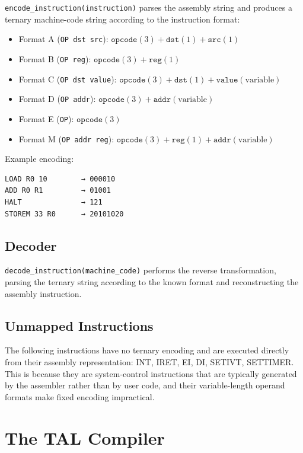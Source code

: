 \documentclass[10pt,a4paper,twoside]{book}
\begin{document}
\texttt{encode\_instruction(instruction)} parses the assembly string and produces a
ternary machine-code string according to the instruction format:

\begin{itemize}
    \item Format A (\texttt{OP dst src}): $\texttt{opcode}(3) + \texttt{dst}(1) +
          \texttt{src}(1)$
    \item Format B (\texttt{OP reg}): $\texttt{opcode}(3) + \texttt{reg}(1)$
    \item Format C (\texttt{OP dst value}): $\texttt{opcode}(3) + \texttt{dst}(1) +
          \texttt{value}(\text{variable})$
    \item Format D (\texttt{OP addr}): $\texttt{opcode}(3) + \texttt{addr}(\text{variable})$
    \item Format E (\texttt{OP}): $\texttt{opcode}(3)$
    \item Format M (\texttt{OP addr reg}): $\texttt{opcode}(3) + \texttt{reg}(1) +
          \texttt{addr}(\text{variable})$
\end{itemize}

Example encoding:
\begin{lstlisting}
LOAD R0 10        → 000010
ADD R0 R1         → 01001
HALT              → 121
STOREM 33 R0      → 20101020
\end{lstlisting}

\section{Decoder}

\texttt{decode\_instruction(machine\_code)} performs the reverse transformation,
parsing the ternary string according to the known format and reconstructing the
assembly instruction.

\section{Unmapped Instructions}

The following instructions have no ternary encoding and are executed directly from
their assembly representation: INT, IRET, EI, DI, SETIVT, SETTIMER. This is because
they are system-control instructions that are typically generated by the assembler
rather than by user code, and their variable-length operand formats make fixed
encoding impractical.

\chapter{The TAL Compiler}
\label{ch:tal}
\end{document}
